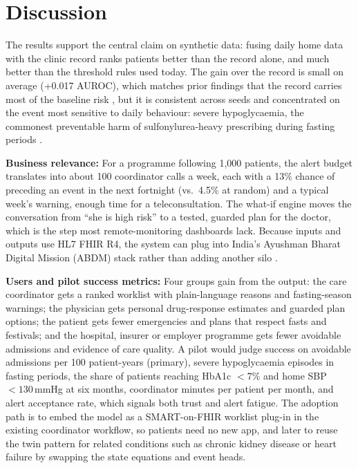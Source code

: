 \documentclass[conference]{IEEEtran}
\begin{document}
\section{Discussion}
The results support the central claim on synthetic data: fusing daily home data with the clinic record ranks patients better than the record alone, and much better than the threshold rules used today. The gain over the record is small on average (+0.017 AUROC), which matches prior findings that the record carries most of the baseline risk \cite{rajkomar2018}, but it is consistent across seeds and concentrated on the event most sensitive to daily behaviour: severe hypoglycaemia, the commonest preventable harm of sulfonylurea-heavy prescribing during fasting periods \cite{hassanein2022}.

\textbf{Business relevance:} For a programme following 1{,}000 patients, the alert budget translates into about 100 coordinator calls a week, each with a 13\% chance of preceding an event in the next fortnight (vs.\ 4.5\% at random) and a typical week's warning, enough time for a teleconsultation. The what-if engine moves the conversation from ``she is high risk'' to a tested, guarded plan for the doctor, which is the step most remote-monitoring dashboards lack. Because inputs and outputs use HL7 FHIR R4, the system can plug into India's Ayushman Bharat Digital Mission (ABDM) stack rather than adding another silo \cite{mandel2016}.

\textbf{Users and pilot success metrics:} Four groups gain from the output: the care coordinator gets a ranked worklist with plain-language reasons and fasting-season warnings; the physician gets personal drug-response estimates and guarded plan options; the patient gets fewer emergencies and plans that respect fasts and festivals; and the hospital, insurer or employer programme gets fewer avoidable admissions and evidence of care quality. A pilot would judge success on avoidable admissions per 100 patient-years (primary), severe hypoglycaemia episodes in fasting periods, the share of patients reaching HbA1c $<7\%$ and home SBP $<130$\,mmHg at six months, coordinator minutes per patient per month, and alert acceptance rate, which signals both trust and alert fatigue. The adoption path is to embed the model as a SMART-on-FHIR worklist plug-in in the existing coordinator workflow, so patients need no new app, and later to reuse the twin pattern for related conditions such as chronic kidney disease or heart failure by swapping the state equations and event heads.
\end{document}
